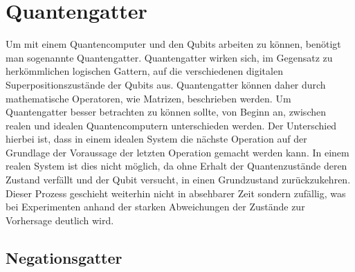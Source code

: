 \documentclass[12pt]{report}
\begin{document}
\newpage
\section{Quantengatter}

Um mit einem Quantencomputer und den Qubits arbeiten zu können, benötigt man sogenannte Quantengatter. Quantengatter wirken sich, im Gegensatz zu herkömmlichen logischen Gattern, auf die verschiedenen digitalen Superpositionszustände der Qubits aus. Quantengatter können daher durch mathematische Operatoren, wie Matrizen, beschrieben werden. Um Quantengatter besser betrachten zu können sollte, von Beginn an, zwischen realen und idealen Quantencomputern unterschieden werden. Der Unterschied hierbei ist, dass in einem idealen System die nächste Operation auf der Grundlage der Voraussage der letzten Operation gemacht werden kann. In einem realen System ist dies nicht möglich, da ohne Erhalt der Quantenzustände deren Zustand verfällt und der Qubit versucht, in einen Grundzustand zurückzukehren. Dieser Prozess geschieht weiterhin nicht in absehbarer Zeit sondern zufällig, was bei Experimenten anhand der starken Abweichungen der Zustände zur Vorhersage deutlich wird.

	\subsection{Negationsgatter}	%
\end{document}
